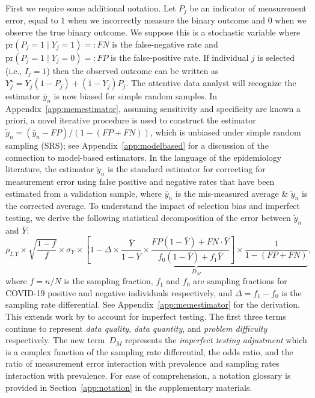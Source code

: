 \documentclass[11pt]{amsart}
\numberwithin{equation}{section}
\theoremstyle{plain}
\def\pr{\text{pr}}
\begin{document}
 First we require some additional notation.  Let $P_j$ be an indicator of measurement error, equal to $1$ when we incorrectly measure the binary outcome and $0$ when we observe the true binary outcome. We suppose this is a stochastic variable where $\pr(P_j = 1 \mid Y_j = 1) =: FN$ is the false-negative rate and $\pr(P_j = 1 \mid Y_j = 0) =: FP$ is the false-positive rate.  If individual $j$ is selected (i.e., $I_j = 1$) then the observed outcome can be written as $Y_j^{\star} = Y_j(1-P_j) + (1-Y_j) P_j$.  The attentive data analyst will recognize the estimator $\bar y_n$ is now biased for simple random samples.  In Appendix~\ref{app:memestimator}, assuming sensitivity and specificity are known a priori, a novel iterative procedure is used to construct the estimator $\tilde y_n = (\bar y_n - FP)/(1-(FP+FN))$, which is unbiased under simple random sampling (SRS); see Appendix~\ref{app:modelbased} for a discussion of the connection to model-based estimators. In the language of the epidemiology literature, the estimator $\tilde y_n$ is the standard estimator for correcting for measurement error using false positive and negative rates that have been estimated from a validation sample, where $\bar y_n$ is the mis-measured average \& $\tilde y_n$ is the corrected average. To understand the impact of selection bias and imperfect testing, we derive the following statistical decomposition of the error between $\tilde y_n$ and $\bar Y$:
 \begin{equation}
 \label{eq:statdecomp}
 \rho_{I,Y} \times \sqrt{\frac{1-f}{f}} \times \sigma_{Y}
 \times \underbrace{\left[ 1 - \Delta \times \frac{\bar Y}{1-\bar Y} \times \frac{FP(1-\bar Y) + FN \cdot \bar Y}{f_0 (1-\bar Y) + f_1 \bar Y} \right] \times \frac{1}{1-(FP+FN)}}_{D_M},
 \end{equation}
 where $f=n/N$ is the sampling fraction, $f_1$ and $f_0$ are sampling fractions for COVID-19 positive and negative individuals respectively, and $\Delta = f_1 - f_0$ is the sampling rate differential.  See Appendix~\ref{app:memestimator} for the derivation. This extends work by \cite{Meng2018} to account for imperfect testing. The first three terms continue to represent \emph{data quality}, \emph{data quantity}, and \emph{problem difficulty} respectively.  The new term~$D_M$ represents the \emph{imperfect testing adjustment} which is a complex function of the sampling rate differential, the odds ratio, and the ratio of measurement error interaction with prevalence and sampling rates interaction with prevalence.
 For ease of comprehension, a notation glossary is provided in Section~\ref{app:notation} in the supplementary materials.
\end{document}
